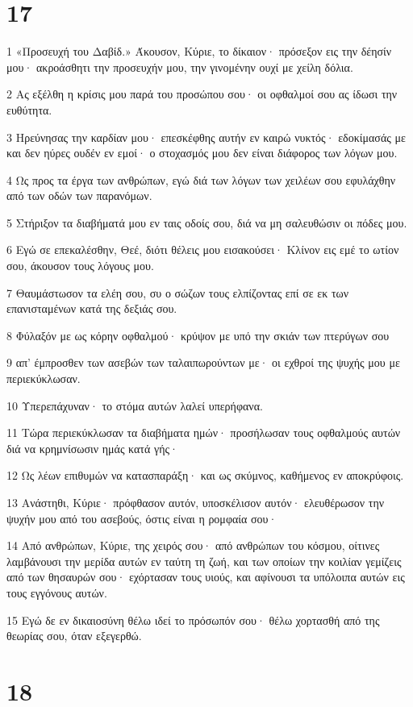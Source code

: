 \chapter{17}

\par 1 «Προσευχή του Δαβίδ.» Άκουσον, Κύριε, το δίκαιον· πρόσεξον εις την δέησίν μου· ακροάσθητι την προσευχήν μου, την γινομένην ουχί με χείλη δόλια.
\par 2 Ας εξέλθη η κρίσις μου παρά του προσώπου σου· οι οφθαλμοί σου ας ίδωσι την ευθύτητα.
\par 3 Ηρεύνησας την καρδίαν μου· επεσκέφθης αυτήν εν καιρώ νυκτός· εδοκίμασάς με και δεν ηύρες ουδέν εν εμοί· ο στοχασμός μου δεν είναι διάφορος των λόγων μου.
\par 4 Ως προς τα έργα των ανθρώπων, εγώ διά των λόγων των χειλέων σου εφυλάχθην από των οδών των παρανόμων.
\par 5 Στήριξον τα διαβήματά μου εν ταις οδοίς σου, διά να μη σαλευθώσιν οι πόδες μου.
\par 6 Εγώ σε επεκαλέσθην, Θεέ, διότι θέλεις μου εισακούσει· Κλίνον εις εμέ το ωτίον σου, άκουσον τους λόγους μου.
\par 7 Θαυμάστωσον τα ελέη σου, συ ο σώζων τους ελπίζοντας επί σε εκ των επανισταμένων κατά της δεξιάς σου.
\par 8 Φύλαξόν με ως κόρην οφθαλμού· κρύψον με υπό την σκιάν των πτερύγων σου
\par 9 απ' έμπροσθεν των ασεβών των ταλαιπωρούντων με· οι εχθροί της ψυχής μου με περιεκύκλωσαν.
\par 10 Υπερεπάχυναν· το στόμα αυτών λαλεί υπερήφανα.
\par 11 Τώρα περιεκύκλωσαν τα διαβήματα ημών· προσήλωσαν τους οφθαλμούς αυτών διά να κρημνίσωσιν ημάς κατά γής·
\par 12 Ως λέων επιθυμών να κατασπαράξη· και ως σκύμνος, καθήμενος εν αποκρύφοις.
\par 13 Ανάστηθι, Κύριε· πρόφθασον αυτόν, υποσκέλισον αυτόν· ελευθέρωσον την ψυχήν μου από του ασεβούς, όστις είναι η ρομφαία σου·
\par 14 Από ανθρώπων, Κύριε, της χειρός σου· από ανθρώπων του κόσμου, οίτινες λαμβάνουσι την μερίδα αυτών εν ταύτη τη ζωή, και των οποίων την κοιλίαν γεμίζεις από των θησαυρών σου· εχόρτασαν τους υιούς, και αφίνουσι τα υπόλοιπα αυτών εις τους εγγόνους αυτών.
\par 15 Εγώ δε εν δικαιοσύνη θέλω ιδεί το πρόσωπόν σου· θέλω χορτασθή από της θεωρίας σου, όταν εξεγερθώ.

\chapter{18}

